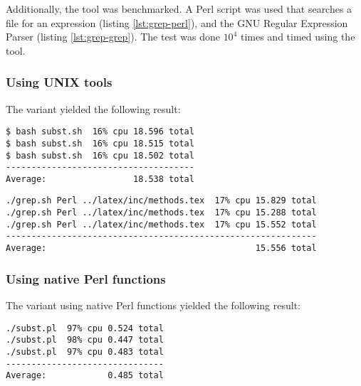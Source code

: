 Additionally, the  tool was benchmarked. A Perl script was used that searches a file for an expression (listing \ref{lst:grep-perl}), and the GNU Regular Expression Parser  (listing \ref{lst:grep-grep}). The test was done $10^4$ times and timed using the  tool.

\subsubsection{Using UNIX tools}


The  variant yielded the following result:

\begin{verbatim}
$ bash subst.sh  16% cpu 18.596 total
$ bash subst.sh  16% cpu 18.515 total
$ bash subst.sh  16% cpu 18.502 total
-------------------------------------
Average:                 18.538 total
\end{verbatim}



\begin{verbatim}
./grep.sh Perl ../latex/inc/methods.tex  17% cpu 15.829 total
./grep.sh Perl ../latex/inc/methods.tex  17% cpu 15.288 total
./grep.sh Perl ../latex/inc/methods.tex  17% cpu 15.552 total
-------------------------------------------------------------
Average:                                         15.556 total
\end{verbatim}

\subsubsection{Using native Perl functions}


The variant using native Perl functions yielded the following result:

\begin{verbatim}
./subst.pl  97% cpu 0.524 total
./subst.pl  98% cpu 0.447 total
./subst.pl  97% cpu 0.483 total
-------------------------------
Average:            0.485 total
\end{verbatim}



